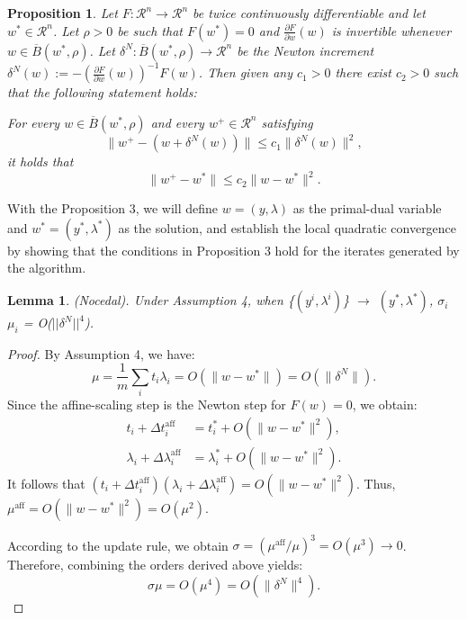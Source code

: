 \documentclass[conference]{IEEEtran}
\theoremstyle{plain}
\newtheorem{lemma}[theorem]{Lemma}
\newtheorem{proposition}[theorem]{Proposition}
\begin{document}
\begin{proposition}
Let $F : \mathcal{R}^n \to \mathcal{R}^n$ be twice continuously differentiable and let $w^* \in \mathcal{R}^n$.
Let $\rho > 0$ be such that $F(w^*) = 0$ and $\frac{\partial F}{\partial w}(w)$ is invertible whenever $w \in \overline{B}(w^*, \rho)$.
Let $\delta^N : \overline{B}(w^*, \rho) \to \mathcal{R}^n$ be the Newton increment $\delta^N(w) := -\left(\frac{\partial F}{\partial w}(w)\right)^{-1} F(w)$.
Then given any $c_1 > 0$ there exist $c_2 > 0$ such that the following statement holds:

For every $w \in \overline{B}(w^*, \rho)$ and every $w^+ \in \mathcal{R}^n$ satisfying
\begin{equation}
    \|w^+ - (w + \delta^N(w))\| \leq c_1 \|\delta^N(w)\|^2,
    \label{ineq:condition}
\end{equation}
it holds that
\begin{equation}
    \|w^+ - w^*\| \leq c_2 \|w - w^*\|^2.
\end{equation}
\end{proposition}

With the Proposition 3, we will define $w = (y, \lambda)$ as the primal-dual variable and $w^* = (y^*, \lambda^*)$ as the solution,
and establish the local quadratic convergence by showing that the conditions in Proposition 3 hold for the iterates generated by the algorithm.

\begin{lemma}(Nocedal).
    Under Assumption 4, when \{$(y^i, \lambda^i)$\} $\rightarrow$ $(y^*, \lambda^*)$, $\sigma_i$ $\mu_i$ = O($||\delta^N||^4$).
\end{lemma}

\begin{proof}
    By Assumption 4, we have:
    \begin{equation*}
        \mu = \frac{1}{m} \sum_i t_i \lambda_i = O(\|w - w^*\|) = O(\|\delta^N\|).
    \end{equation*}
    Since the affine-scaling step is the Newton step for $F(w) = 0$, we obtain:
    \begin{align*}
        t_i + \Delta t_i^{\mathrm{aff}} &= t_i^* + O(\|w - w^*\|^2), \\
        \lambda_i + \Delta \lambda_i^{\mathrm{aff}} &= \lambda_i^* + O(\|w - w^*\|^2).
    \end{align*}
    It follows that $(t_i + \Delta t_i^{\mathrm{aff}})(\lambda_i + \Delta \lambda_i^{\mathrm{aff}}) = O(\|w - w^*\|^2)$. 
    Thus, $\mu^{\mathrm{aff}} = O(\|w - w^*\|^2) = O(\mu^2)$. 

    According to the update rule, we obtain $\sigma = (\mu^{\mathrm{aff}} / \mu)^3 = O(\mu^3) \to 0$. 
    Therefore, combining the orders derived above yields:
    \begin{equation*}
        \sigma\mu = O(\mu^4) = O(\|\delta^N\|^4).
    \end{equation*}
\end{proof}
\end{document}
